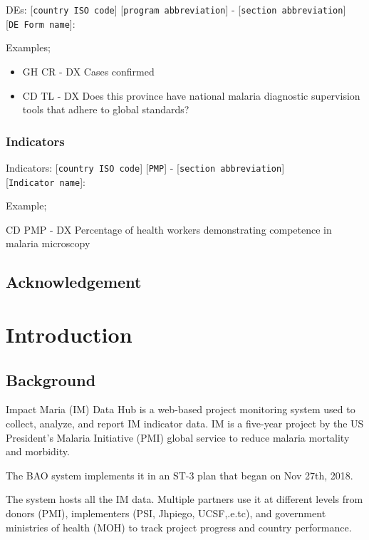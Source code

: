 \documentclass[]{book}
\providecommand{\tightlist}{%
  \setlength{\itemsep}{0pt}\setlength{\parskip}{0pt}}
\begin{document}
DEs: {[}\texttt{country\ ISO\ code}{]} {[}\texttt{program\ abbreviation}{]} - {[}\texttt{section\ abbreviation}{]} {[}\texttt{DE\ Form\ name}{]}:

Examples;

\begin{itemize}
\tightlist
\item
  GH CR - DX Cases confirmed
\item
  CD TL - DX Does this province have national malaria diagnostic supervision tools that adhere to global standards?
\end{itemize}

\hypertarget{indicators}{%
\subsection{Indicators}\label{indicators}}

Indicators: {[}\texttt{country\ ISO\ code}{]} {[}\texttt{PMP}{]} - {[}\texttt{section\ abbreviation}{]} {[}\texttt{Indicator\ name}{]}:

Example;

CD PMP - DX Percentage of health workers demonstrating competence in malaria microscopy

\hypertarget{acknowledgement}{%
\section{Acknowledgement}\label{acknowledgement}}

\hypertarget{intro}{%
\chapter{Introduction}\label{intro}}

\hypertarget{background}{%
\section{Background}\label{background}}

Impact Maria (IM) Data Hub is a web-based project monitoring system used to collect, analyze, and report IM indicator data. IM is a five-year project by the US President's Malaria Initiative (PMI) global service to reduce malaria mortality and morbidity.

The BAO system implements it in an ST-3 plan that began on Nov 27th, 2018.

The system hosts all the IM data. Multiple partners use it at different levels from donors (PMI), implementers (PSI, Jhpiego, UCSF,.e.tc), and government ministries of health (MOH) to track project progress and country performance.
\end{document}
